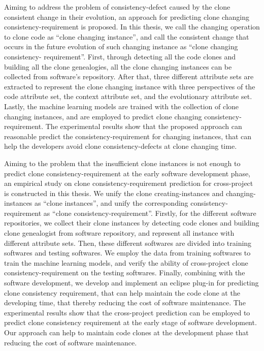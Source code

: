 {Aiming to address the problem of consistency-defect caused by the clone consistent change in their evolution, an approach for predicting clone changing consistency-requirement is proposed. 
In this thesis, we call the changing operation to clone code as ``clone changing instance'', and call the consistent change that occurs in the future evolution of such changing instance as ``clone changing consistency- requirement''.
First, through detecting all the code clones and building all the clone genealogies, all the clone changing instances can be collected  from software's repository.
After that, three different attribute sets are extracted to represent the clone changing instance with three perspectives of the code attribute set, the context attribute set, and the evolutionary attribute set.
Lastly, the machine learning models are trained with the collection of clone changing instances, and are employed to predict clone changing consistency-requirement.
The experimental results show that the proposed approach can reasonable predict the consistency-requirement for changing instances, that can help the developers avoid clone consistency-defects at clone changing time.

Aiming to the problem that the insufficient clone instances is not enough to predict clone consistency-requirement at the early software development phase, an empirical study on clone consistency-requirement prediction for cross-project is constructed in this thesis.
We unify the clone creating-instances and changing-instances as ``clone instances'', and unify the corresponding consistency-requirement as ``clone consistency-requirement''.
Firstly, for the different software repositories, we collect their clone instances by detecting code clones and building clone genealogist from software repository, and represent all instance with different attribute sets.
Then, these different softwares are divided into training softwares and testing softwares. We employ the data from training softwares to train the machine learning models, and verify the ability of cross-project clone consistency-requirement on the testing softwares.
Finally, combining with the software development, we develop and implement an eclipse plug-in for predicting clone consistency requirement, that can help maintain the code clone at the developing time, that thereby reducing the cost of software maintenance.
The experimental results show that the cross-project prediction can be employed to predict clone consistency requirement at the early stage of software development.
Our approach can help to maintain code clones at the development phase that reducing the cost of software maintenance.

}
